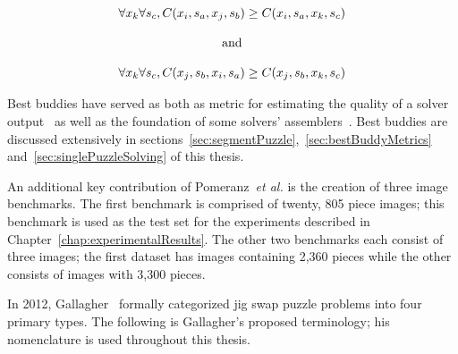 \begin{equation} \label{eq:pomeranzBestBuddyDefinition}
\centering
\begin{split}
	\begin{matrix}
		\forall{x_{k}}\forall{s_c},C(x_i, s_a, x_j, s_b) \geq C(x_i, s_a, x_k, s_c)
		\\
		\\
		\textnormal{and}
		\\
		\\
		\forall{x_{k}}\forall{s_c},C(x_j, s_b, x_i, s_a) \geq C(x_j, s_b, x_k, s_c)
	\end{matrix}
\end{split}
\end{equation} 


Best buddies have served as both as metric for estimating the quality of a solver output~\cite{sholomon2013} as well as the foundation of some solvers' assemblers~\cite{paikin2015}.  Best buddies are discussed extensively in sections~\ref{sec:segmentPuzzle},~\ref{sec:bestBuddyMetrics} and~\ref{sec:singlePuzzleSolving} of this thesis.

An additional key contribution of Pomeranz~\textit{et al.} is the creation of three image benchmarks.  The first benchmark is comprised of twenty, 805 piece images; this benchmark is used as the test set for the experiments described in Chapter~\ref{chap:experimentalResults}. The other two benchmarks each consist of three images; the first dataset has images containing 2,360 pieces while the other consists of images with 3,300 pieces.

In 2012, Gallagher~\cite{gallagher2012} formally categorized jig swap puzzle problems into four primary types.  The following is Gallagher's proposed terminology; his nomenclature is used throughout this thesis.

